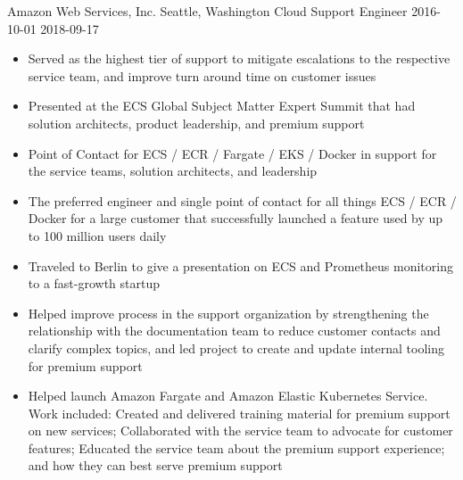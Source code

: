 \roleheader
    {Amazon Web Services, Inc.}
    {Seattle, Washington}
    {Cloud Support Engineer }
    {2016-10-01}
    {2018-09-17}
\begin{itemize}

    \item Served as the highest tier of support to mitigate escalations to the respective service team, and improve turn around time on customer issues

    \item Presented at the ECS Global Subject Matter Expert Summit that had solution architects, product leadership, and premium support

    \item Point of Contact for ECS / ECR / Fargate / EKS / Docker in support for the service teams, solution architects, and leadership

    \item The preferred engineer and single point of contact for all things ECS / ECR / Docker for a large customer that successfully launched a feature used by up to 100 million users daily

    \item Traveled to Berlin to give a presentation on ECS and Prometheus monitoring to a fast-growth startup

    \item Helped improve process in the support organization by strengthening the relationship with the documentation team to reduce customer contacts and clarify complex topics, and led project to create and update internal tooling for premium support

    \item Helped launch Amazon Fargate and Amazon Elastic Kubernetes Service. Work included: Created and delivered training material for premium support on new services; Collaborated with the service team to advocate for customer features; Educated the service team about the premium support experience; and how they can best serve premium support

\end{itemize}